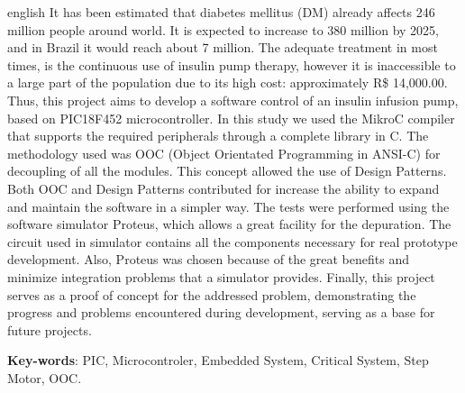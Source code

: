 \documentclass[	12pt, Times, openright, twoside, a4paper, english, brazil]{abntex2}
\begin{document}
\begin{resumo}[Abstract]
\begin{otherlanguage*}{english}
It has been estimated that diabetes mellitus (DM) already affects 246 million people around world. It is expected to increase to 380 million by 2025, and in Brazil it would reach about 7 million. The adequate treatment in most times, is the continuous use of insulin pump therapy, however it is inaccessible to a large part of the population due to its high cost: approximately R\$ 14,000.00. Thus, this project aims to develop a software control of an insulin infusion pump, based on PIC18F452 microcontroller. In this study we used the MikroC compiler that supports the required peripherals through a complete library in C. The methodology used was OOC (Object Orientated Programming in ANSI-C) for decoupling of all the modules. This concept allowed the use of Design Patterns. Both OOC and Design Patterns contributed for increase the ability to expand and maintain the software in a simpler way. The tests were performed using the software simulator Proteus, which allows a great facility for the depuration. The circuit used in simulator  contains all the components necessary for real prototype development. Also, Proteus was chosen because of the great benefits and minimize integration problems that a simulator provides. Finally, this project serves as a proof of concept for the addressed problem, demonstrating the progress and problems encountered during development, serving as a base for future projects.

   \vspace{\onelineskip}
 
   \noindent 
   \textbf{Key-words}: PIC, Microcontroler, Embedded System, Critical System, Step Motor, OOC.
\end{otherlanguage*}
\end{resumo}

\listoffigures*
\cleardoublepage

\listoftables*
\cleardoublepage
\end{document}
